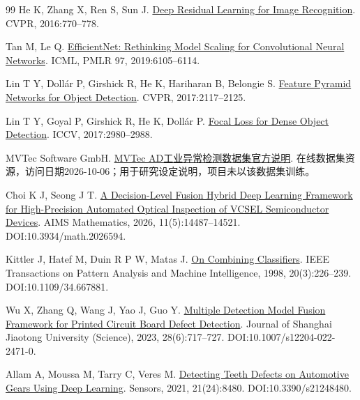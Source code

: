 \begin{thebibliography}{99}
  He K, Zhang X, Ren S, Sun J. \protect\href{https://arxiv.org/abs/1512.03385}{Deep Residual Learning for Image Recognition}. CVPR, 2016:770--778.

  Tan M, Le Q. \protect\href{https://proceedings.mlr.press/v97/tan19a.html}{EfficientNet: Rethinking Model Scaling for Convolutional Neural Networks}. ICML, PMLR 97, 2019:6105--6114.

  Lin T Y, Dollár P, Girshick R, He K, Hariharan B, Belongie S. \protect\href{https://arxiv.org/abs/1612.03144}{Feature Pyramid Networks for Object Detection}. CVPR, 2017:2117--2125.

  Lin T Y, Goyal P, Girshick R, He K, Dollár P. \protect\href{https://arxiv.org/abs/1708.02002}{Focal Loss for Dense Object Detection}. ICCV, 2017:2980--2988.

  MVTec Software GmbH. \protect\href{https://www.mvtec.com/research-teaching/datasets/mvtec-ad}{MVTec AD工业异常检测数据集官方说明}. 在线数据集资源，访问日期2026-10-06；用于研究设定说明，项目未以该数据集训练。

  Choi K J, Seong J T. \protect\href{https://www.aimspress.com/article/doi/10.3934/math.2026594}{A Decision-Level Fusion Hybrid Deep Learning Framework for High-Precision Automated Optical Inspection of VCSEL Semiconductor Devices}. AIMS Mathematics, 2026, 11(5):14487--14521. DOI:10.3934/math.2026594.

  Kittler J, Hatef M, Duin R P W, Matas J. \protect\href{https://people.sabanciuniv.edu/berrin/cs512/reading/kittler-combining.pdf}{On Combining Classifiers}. IEEE Transactions on Pattern Analysis and Machine Intelligence, 1998, 20(3):226--239. DOI:10.1109/34.667881.

  Wu X, Zhang Q, Wang J, Yao J, Guo Y. \protect\href{https://xuebao.sjtu.edu.cn/sjtu_en/CN/Y2023/V28/I6/717}{Multiple Detection Model Fusion Framework for Printed Circuit Board Defect Detection}. Journal of Shanghai Jiaotong University (Science), 2023, 28(6):717--727. DOI:10.1007/s12204-022-2471-0.

  Allam A, Moussa M, Tarry C, Veres M. \protect\href{https://doi.org/10.3390/s21248480}{Detecting Teeth Defects on Automotive Gears Using Deep Learning}. Sensors, 2021, 21(24):8480. DOI:10.3390/s21248480.

\end{thebibliography}
